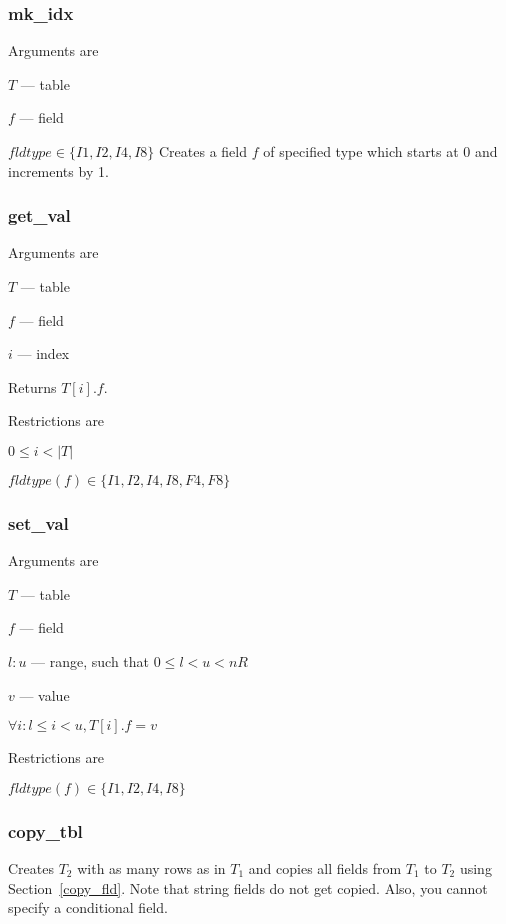 \documentclass{report}
\begin{document}

\subsubsection{mk\_idx}
\label{mk_idx} 
Arguments are 
\be
\item \(T\) --- table
\item \(f\) --- field
\item \(fldtype \in \{I1, I2, I4, I8\}\)
\ee
Creates a field \(f\) of specified type which starts at 0 and
increments by 1.

\subsubsection{get\_val}
\label{get_val}
Arguments are 
\be
\item \(T\) --- table
\item \(f\) --- field
\item \(i\) --- index 
\ee

Returns \(T[i].f\). 

Restrictions are
\be
\item \(0 \leq i < |T|\)
\item \(fldtype(f) \in \{I1, I2, I4, I8, F4, F8\}\)
\ee

\subsubsection{set\_val}
\label{set_val}
Arguments are 
\be
\item \(T\) --- table
\item \(f\) --- field
\item \(l:u\) --- range, such that \(0 \leq l < u < nR\) 
\item \(v\) --- value 
\ee

\(\forall i: l \leq i < u, T[i].f = v\)

Restrictions are
\be
\item \(fldtype(f) \in \{I1, I2, I4, I8\}\)
\ee

\subsubsection{copy\_tbl}
\label{copy_tbl}

Creates \(T_2\) with as many rows as in \(T_1\) and copies all fields
from \(T_1\) to \(T_2\) using Section~\ref{copy_fld}. Note that string
fields do not get copied. Also, you cannot specify a conditional field.
\end{document}
